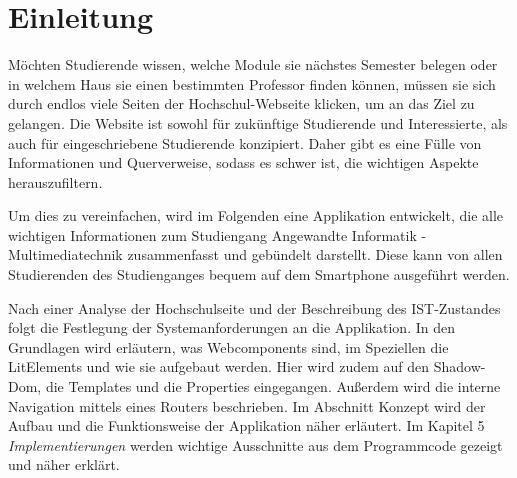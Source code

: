 \documentclass[12pt,					%
							 oneside,			%
							 a4paper,			%
							 halfparskip,		%
							 liststotoc,			%
							 bibtotoc,			%
							 fleqn,				%
							 pointlessnumbers]	%
							 {scrreprt}
\newcommand{\blankpage}{
	\newpage
	\thispagestyle{empty}
	\mbox{}
	\newpage
}
\begin{document}
	\onehalfspacing 					%
	
	\tableofcontents					%

\newpage

\chapter{Einleitung}
Möchten Studierende wissen, welche Module sie nächstes Semester belegen oder in welchem Haus sie einen bestimmten Professor finden können, müssen sie sich durch endlos viele Seiten der Hochschul-Webseite klicken, um an das Ziel zu gelangen. Die Website ist sowohl für zukünftige Studierende und Interessierte, als auch für eingeschriebene Studierende konzipiert. Daher gibt es eine Fülle von Informationen und Querverweise, sodass es schwer ist, die wichtigen Aspekte herauszufiltern.

Um dies zu vereinfachen, wird im Folgenden eine Applikation entwickelt, die alle wichtigen Informationen zum Studiengang Angewandte Informatik - Multimediatechnik zusammenfasst und gebündelt darstellt. Diese kann von allen Studierenden des Studienganges bequem auf dem Smartphone ausgeführt werden.

Nach einer Analyse der Hochschulseite und der Beschreibung des IST-Zustandes folgt die Festlegung der Systemanforderungen an die Applikation. In den Grundlagen wird erläutern, was Webcomponents sind, im Speziellen die LitElements und wie sie aufgebaut werden. Hier wird zudem auf den Shadow-Dom, die Templates und die Properties eingegangen. Außerdem wird die interne Navigation mittels eines Routers beschrieben. Im Abschnitt Konzept wird der Aufbau und die Funktionsweise der Applikation näher erläutert. Im Kapitel 5 \textit{Implementierungen} werden wichtige Ausschnitte aus dem Programmcode gezeigt und näher erklärt.
\end{document}

